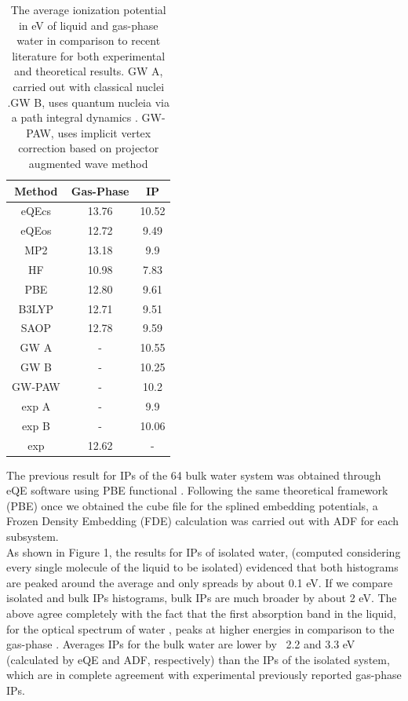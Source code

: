 \documentclass[12pt,a4paper]{article}
\begin{document}
\begin{table}[!ht]
\begin{center}
\setlength{\tabcolsep}{18pt}
  \caption{The average ionization potential in eV of liquid and gas-phase water in comparison to recent literature for both experimental and theoretical results. GW A, carried out with classical nuclei \cite{gaiduk2018electron}.GW B, uses quantum nucleia via a path integral dynamics \cite{gaiduk2018electron}. GW-PAW, uses implicit vertex correction based on projector augmented wave method\cite{ziaei2018probing}}
  \label{tab:table1}
  \begin{tabular}{ ccc }
  \hline
          Method &Gas-Phase& IP \\
  	\hline
          eQEcs&13.76&10.52\\
          eQEos&12.72&9.49\\
          MP2&13.18&9.9\\
          HF&10.98& 7.83\\
          PBE&12.80&9.61\\
          B3LYP&12.71&9.51\\
          SAOP&12.78&9.59\\
          GW A \cite{gaiduk2018electron} &- &10.55\\
          GW B\cite{gaiduk2018electron} &- &10.25\\
          GW-PAW\cite{ziaei2018probing} &- &10.2 \\
          exp A \cite{winter2004full} &- &9.9 \\
          exp B \cite{delahay1981chem} &- &10.06 \\
          exp \cite{nist2015nist} &12.62 &- \\
  	\hline
  	\end{tabular}
 \end{center}
\end{table}

The previous result for IPs of the 64 bulk water system was obtained through eQE software using PBE functional \cite{tolle2019charged}. 
Following the same theoretical framework (PBE) once we obtained the cube file for the splined embedding potentials, a Frozen Density 
Embedding (FDE) calculation was carried out with ADF for each subsystem. \\

As shown in Figure 1, the results for IPs of isolated water, (computed considering every single
molecule of the liquid to be isolated) evidenced that both histograms are peaked around the average
and only spreads by about 0.1 eV. If we compare isolated and bulk IPs histograms,
bulk IPs are much broader by about 2 eV. The above agree completely with the fact that the first
absorption band in the liquid, for the optical spectrum of water \cite{blase2016erratum,genova2017cooperation,hermann2008resolving,hahn2005optical},
peaks at higher energies in comparison to the gas-phase \cite{tolle2019charged}. Averages IPs for the bulk water are lower by ~2.2 and 3.3 eV
(calculated by eQE and ADF, respectively) than the IPs of the isolated system, which are in complete agreement
with experimental previously reported \cite{nist2015nist} gas-phase IPs. \\
\end{document}
